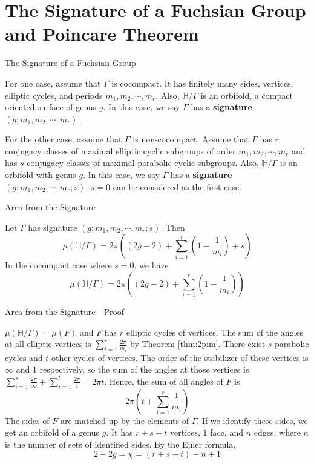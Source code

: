 \documentclass[
	american,
	sections numbered,
	usenames,
	xcolor=dvipsnames,
	aspectratio=169,
]{beamer}
\newcommand{\vocab}[1]{\textbf{\color{blue}\sffamily #1}}
\renewcommand{\H}{\mathbb{H}}
\theoremstyle{plain}%
\begin{document}
\section{The Signature of a Fuchsian Group and Poincare Theorem}

\begin{frame}{The Signature of a Fuchsian Group}

	For one case, assume that $\Gamma$ is cocompact. It has finitely many sides, vertices, elliptic cycles, and periods $m_1,m_2,\cdots,m_r$. Also, $\H/\Gamma$ is an orbifold, a compact oriented surface of genus $g$. In this case, we say $\Gamma$ has a \vocab{signature} $(g;m_1,m_2,\cdots,m_r)$.

    For the other case, assume that $\Gamma$ is non-cocompact. Assume that $\Gamma$ has $r$ conjugacy classes of maximal elliptic cyclic subgroups of order $m_1,m_2,\cdots,m_r$ and has $s$ conjugacy classes of maximal parabolic cyclic subgroups. Also, $\H/\Gamma$ is an orbifold with genus $g$. In this case, we say $\Gamma$ has a \vocab{signature} $(g;m_1,m_2,\cdots,m_r;s)$. $s=0$ can be considered as the first case.

\end{frame}

\begin{frame}{Area from the Signature}

	\begin{theorem}\label{thm:sigarea}
    Let $\Gamma$ has signature $(g;m_1,m_2,\cdots,m_r;s)$. Then 
    $$\mu(\H/\Gamma)=2\pi\left((2g-2)+\sum_{i=1}^r\left(1-\frac{1}{m_i}\right)+s\right)$$
    In the cocompact case where $s=0$, we have
    $$\mu(\H/\Gamma)=2\pi\left((2g-2)+\sum_{i=1}^r\left(1-\frac{1}{m_i}\right)\right)$$
    \end{theorem}

\end{frame}

\begin{frame}{Area from the Signature - Proof}

	$\mu(\H/\Gamma)=\mu(F)$ and $F$ has $r$ elliptic cycles of vertices. The sum of the angles at all elliptic vertices is $\sum_{i=1}^r\frac{2\pi}{m_i}$ by Theorem \ref{thm:2pim}. There exist $s$ parabolic cycles and $t$ other cycles of vertices. The order of the stabilizer of these vertices is $\infty$ and $1$ respectively, so the sum of the angles at those vertices is $\sum_{i=1}^s\frac{2\pi}{\infty}+\sum_{i=1}^t\frac{2\pi}{1}=2\pi t$. Hence, the sum of all angles of $F$ is $$2\pi\left(t+\sum_{i=1}^r\frac{1}{m_i}\right)$$
    The sides of $F$ are matched up by the elements of $\Gamma$. If we identify these sides, we get an orbifold of a genus $g$. It has $r+s+t$ vertices, $1$ face, and $n$ edges, where $n$ is the number of sets of identified sides. By the Euler formula, $$2-2g=\chi=(r+s+t)-n+1$$

\end{frame}
\end{document}
